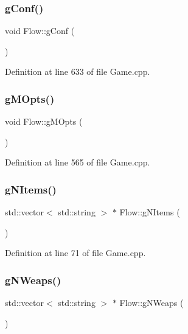 \subsubsection{\texorpdfstring{g\+Conf()}{gConf()}}
{\footnotesize\ttfamily void Flow\+::g\+Conf (\begin{DoxyParamCaption}{ }\end{DoxyParamCaption})}



Definition at line 633 of file Game.\+cpp.

\hypertarget{namespace_flow_a0dffd1ca59d045eb50e9cb6cb48601bd}{}\label{namespace_flow_a0dffd1ca59d045eb50e9cb6cb48601bd} 
\subsubsection{\texorpdfstring{g\+M\+Opts()}{gMOpts()}}
{\footnotesize\ttfamily void Flow\+::g\+M\+Opts (\begin{DoxyParamCaption}{ }\end{DoxyParamCaption})}



Definition at line 565 of file Game.\+cpp.

\hypertarget{namespace_flow_ac4033be4d707677351bc7353a173c2e6}{}\label{namespace_flow_ac4033be4d707677351bc7353a173c2e6} 
\subsubsection{\texorpdfstring{g\+N\+Items()}{gNItems()}}
{\footnotesize\ttfamily std\+::vector$<$ std\+::string $>$ $\ast$ Flow\+::g\+N\+Items (\begin{DoxyParamCaption}{ }\end{DoxyParamCaption})}



Definition at line 71 of file Game.\+cpp.

\hypertarget{namespace_flow_a3b1a019f8216981627fc188d1f0158b2}{}\label{namespace_flow_a3b1a019f8216981627fc188d1f0158b2} 
\subsubsection{\texorpdfstring{g\+N\+Weaps()}{gNWeaps()}}
{\footnotesize\ttfamily std\+::vector$<$ std\+::string $>$ $\ast$ Flow\+::g\+N\+Weaps (\begin{DoxyParamCaption}{ }\end{DoxyParamCaption})}



